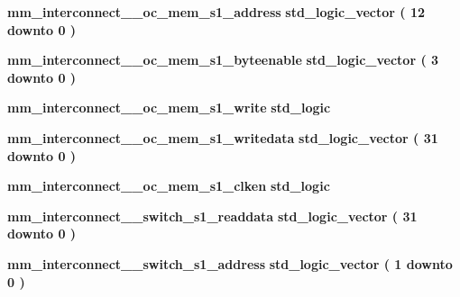 \begin{DoxyCompactItemize}
\item 
{\bf mm\+\_\+interconnect\+\_\+\_\+oc\+\_\+mem\+\_\+s1\+\_\+address} {\bfseries \textcolor{comment}{std\+\_\+logic\+\_\+vector}\textcolor{vhdlchar}{ }\textcolor{vhdlchar}{(}\textcolor{vhdlchar}{ }\textcolor{vhdlchar}{ } \textcolor{vhdldigit}{12} \textcolor{vhdlchar}{ }\textcolor{keywordflow}{downto}\textcolor{vhdlchar}{ }\textcolor{vhdlchar}{ } \textcolor{vhdldigit}{0} \textcolor{vhdlchar}{ }\textcolor{vhdlchar}{)}\textcolor{vhdlchar}{ }} 
\item 
{\bf mm\+\_\+interconnect\+\_\+\_\+oc\+\_\+mem\+\_\+s1\+\_\+byteenable} {\bfseries \textcolor{comment}{std\+\_\+logic\+\_\+vector}\textcolor{vhdlchar}{ }\textcolor{vhdlchar}{(}\textcolor{vhdlchar}{ }\textcolor{vhdlchar}{ } \textcolor{vhdldigit}{3} \textcolor{vhdlchar}{ }\textcolor{keywordflow}{downto}\textcolor{vhdlchar}{ }\textcolor{vhdlchar}{ } \textcolor{vhdldigit}{0} \textcolor{vhdlchar}{ }\textcolor{vhdlchar}{)}\textcolor{vhdlchar}{ }} 
\item 
{\bf mm\+\_\+interconnect\+\_\+\_\+oc\+\_\+mem\+\_\+s1\+\_\+write} {\bfseries \textcolor{comment}{std\+\_\+logic}\textcolor{vhdlchar}{ }} 
\item 
{\bf mm\+\_\+interconnect\+\_\+\_\+oc\+\_\+mem\+\_\+s1\+\_\+writedata} {\bfseries \textcolor{comment}{std\+\_\+logic\+\_\+vector}\textcolor{vhdlchar}{ }\textcolor{vhdlchar}{(}\textcolor{vhdlchar}{ }\textcolor{vhdlchar}{ } \textcolor{vhdldigit}{31} \textcolor{vhdlchar}{ }\textcolor{keywordflow}{downto}\textcolor{vhdlchar}{ }\textcolor{vhdlchar}{ } \textcolor{vhdldigit}{0} \textcolor{vhdlchar}{ }\textcolor{vhdlchar}{)}\textcolor{vhdlchar}{ }} 
\item 
{\bf mm\+\_\+interconnect\+\_\+\_\+oc\+\_\+mem\+\_\+s1\+\_\+clken} {\bfseries \textcolor{comment}{std\+\_\+logic}\textcolor{vhdlchar}{ }} 
\item 
{\bf mm\+\_\+interconnect\+\_\+\_\+switch\+\_\+s1\+\_\+readdata} {\bfseries \textcolor{comment}{std\+\_\+logic\+\_\+vector}\textcolor{vhdlchar}{ }\textcolor{vhdlchar}{(}\textcolor{vhdlchar}{ }\textcolor{vhdlchar}{ } \textcolor{vhdldigit}{31} \textcolor{vhdlchar}{ }\textcolor{keywordflow}{downto}\textcolor{vhdlchar}{ }\textcolor{vhdlchar}{ } \textcolor{vhdldigit}{0} \textcolor{vhdlchar}{ }\textcolor{vhdlchar}{)}\textcolor{vhdlchar}{ }} 
\item 
{\bf mm\+\_\+interconnect\+\_\+\_\+switch\+\_\+s1\+\_\+address} {\bfseries \textcolor{comment}{std\+\_\+logic\+\_\+vector}\textcolor{vhdlchar}{ }\textcolor{vhdlchar}{(}\textcolor{vhdlchar}{ }\textcolor{vhdlchar}{ } \textcolor{vhdldigit}{1} \textcolor{vhdlchar}{ }\textcolor{keywordflow}{downto}\textcolor{vhdlchar}{ }\textcolor{vhdlchar}{ } \textcolor{vhdldigit}{0} \textcolor{vhdlchar}{ }\textcolor{vhdlchar}{)}\textcolor{vhdlchar}{ }} 

\end{DoxyCompactItemize}

